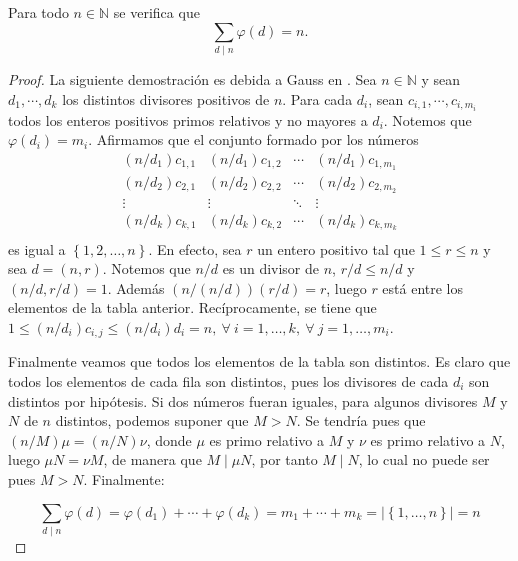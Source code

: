 \begin{proposition}[Gauss]\label{eq:gauss1}
Para todo $n\in\mathbb{N}$ se verifica que 
\begin{equation*}
	\sum_{d \mid n} \varphi(d)=n.
\end{equation*}
\end{proposition}
\begin{proof}
La siguiente demostración es debida a Gauss en \cite{Gauss1}. Sea $n\in\mathbb{N}$ y sean $d_1,\cdots,d_k$ los distintos divisores positivos de $n$. Para cada $d_i$, sean $c_{i,1},\cdots,c_{i,m_i}$ todos los enteros positivos primos relativos y no mayores a $d_i$. Notemos que $\varphi(d_i)=m_i$. Afirmamos que el conjunto formado por los números 
\begin{equation*}
	\renewcommand\arraystretch{2}
	\begin{matrix}
	(n/d_1)c_{1,1} & (n/d_1)c_{1,2} & \cdots & (n/d_1)c_{1,m_1} \\
	(n/d_2)c_{2,1} & (n/d_2)c_{2,2} & \cdots & (n/d_2)c_{2,m_2} \\
	\vdots & \vdots & \ddots & \vdots \\
	(n/d_k)c_{k,1} & (n/d_k)c_{k,2} & \cdots & (n/d_k)c_{k,m_k} \\
	\end{matrix}
\end{equation*}
es igual a $\left\{1,2,\ldots,n\right\}$. En efecto, sea $r$ un entero positivo tal que $1\leq r\leq n$  y sea $d=(n,r)$. Notemos que $n/d$ es un divisor de $n$, $r/d\leq n/d$ y $(n/d,r/d)=1$. Además $(n/(n/d))(r/d)=r$, luego $r$ está entre los elementos de la tabla anterior. Recíprocamente, se tiene que $1\leq (n/d_i)c_{i,j}\leq (n/d_i)d_i=n,\:\forall \: i=1,\ldots,k,\:\forall \: j=1,\ldots,m_i$.
\medskip

Finalmente veamos que todos los elementos de la tabla son distintos. Es claro que todos los elementos de cada fila son distintos, pues los divisores de cada $d_i$ son distintos por hipótesis. Si dos números fueran iguales, para algunos divisores $M$ y $N$ de $n$ distintos, podemos suponer que $M>N$. Se tendría pues que $(n/M)\mu=(n/N)\nu$, donde $\mu$ es primo relativo a $M$ y $\nu$ es primo relativo a $N$, luego $\mu N=\nu M$, de manera que $M \mid \mu N$, por tanto $M \mid N$, lo cual no puede ser pues $M>N$. Finalmente: 

\begin{equation*}
	\sum_{d \mid n} \varphi(d) = \varphi(d_1)+\cdots+\varphi(d_k) = m_1+\cdots+m_k = |\left\{1,\ldots,n\right\}| = n
\end{equation*}
\end{proof}


